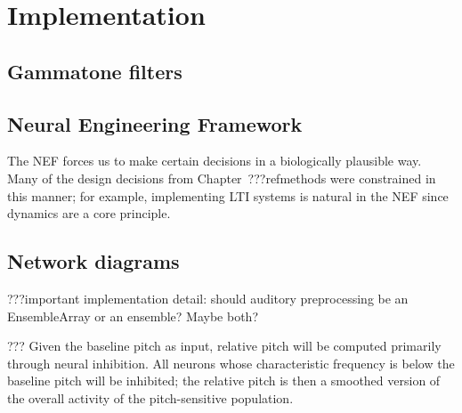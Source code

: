 \chapter{Implementation}



\section{Gammatone filters}

\section{Neural Engineering Framework}

The NEF forces us to make certain decisions
in a biologically plausible way.
Many of the design decisions from Chapter~???refmethods
were constrained in this manner;
for example, implementing LTI systems is natural
in the NEF since dynamics are a core principle.

\section{Network diagrams}

???important implementation detail:
should auditory preprocessing be an EnsembleArray
or an ensemble? Maybe both?

??? Given the baseline pitch as input,
relative pitch will be computed
primarily through neural inhibition.
All neurons whose characteristic frequency is below
the baseline pitch will be inhibited;
the relative pitch is then
a smoothed version of the overall activity
of the pitch-sensitive population.
